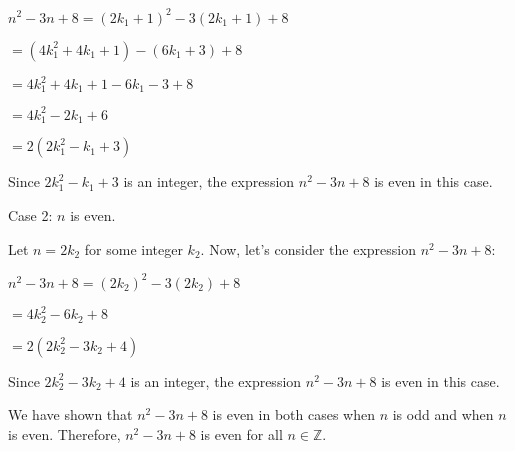 \documentclass{article}
\begin{document}
{\begin{enumerate}[labelindent=0pt,leftmargin=0pt]
$n^2 - 3n + 8 = (2k_1 + 1)^2 - 3(2k_1 + 1) + 8$

$= (4k_1^2 + 4k_1 + 1) - (6k_1 + 3) + 8$

$= 4k_1^2 + 4k_1 + 1 - 6k_1 - 3 + 8$

$= 4k_1^2 - 2k_1 + 6$

$= 2(2k_1^2 - k_1 + 3)$

Since $2k_1^2 - k_1 + 3$ is an integer, the expression $n^2 - 3n + 8$ is even in this case.

Case 2: $n$ is even.

Let $n = 2k_2$ for some integer $k_2$. Now, let's consider the expression $n^2 - 3n + 8$:

$n^2 - 3n + 8 = (2k_2)^2 - 3(2k_2) + 8$

$= 4k_2^2 - 6k_2 + 8$

$= 2(2k_2^2 - 3k_2 + 4)$

Since $2k_2^2 - 3k_2 + 4$ is an integer, the expression $n^2 - 3n + 8$ is even in this case.

We have shown that $n^2 - 3n + 8$ is even in both cases when $n$ is odd and when $n$ is even. Therefore, $n^2 - 3n + 8$ is even for all $n \in \mathbb{Z}$.





\end{enumerate}
}
\end{document}

